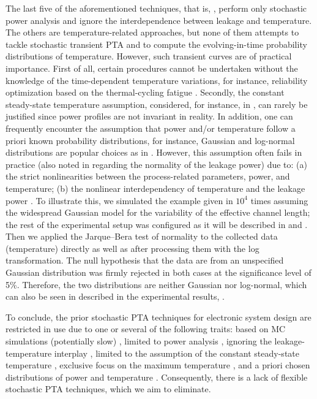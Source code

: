 The last five of the aforementioned techniques, that is, \cite{shen2009,
bhardwaj2006, bhardwaj2008, vrudhula2006, ghanta2006}, perform only stochastic
power analysis and ignore the interdependence between leakage and temperature.
The others are temperature-related approaches, but none of them attempts to
tackle stochastic transient PTA and to compute the evolving-in-time probability
distributions of temperature. However, such transient curves are of practical
importance. First of all, certain procedures cannot be undertaken without the
knowledge of the time-dependent temperature variations, for instance,
reliability optimization based on the thermal-cycling fatigue \cite{ukhov2012}.
Secondly, the constant steady-state temperature assumption, considered, for
instance, in \cite{juan2011, juan2012, huang2009a, lee2013}, can rarely be
justified since power profiles are not invariant in reality. In addition, one
can frequently encounter the assumption that power and/or temperature follow a
priori known probability distributions, for instance, Gaussian and log-normal
distributions are popular choices as in \cite{srivastava2010, juan2012,
bhardwaj2006}. However, this assumption often fails in practice (also noted in
\cite{juan2012} regarding the normality of the leakage power) due to: (a) the
strict nonlinearities between the process-related parameters, power, and
temperature; (b) the nonlinear interdependency of temperature and the leakage
power \cite{liu2007}. To illustrate this, we simulated the example given in
 $10^4$ times assuming the widespread Gaussian model for the
variability of the effective channel length; the rest of the experimental setup
was configured as it will be described in  and
. Then we applied the Jarque--Bera test of normality
to the collected data (temperature) directly as well as after processing them
with the log transformation. The null hypothesis that the data are from an
unspecified Gaussian distribution was firmly rejected in both cases at the
significance level of 5\%. Therefore, the two distributions are neither Gaussian
nor log-normal, which can also be seen in 
described in the experimental results, .

To conclude, the prior stochastic PTA techniques for electronic system design
are restricted in use due to one or several of the following traits: based on MC
simulations (potentially slow) \cite{chandra2010}, limited to power analysis
\cite{chandra2010, shen2009, bhardwaj2006, bhardwaj2008, vrudhula2006,
ghanta2006}, ignoring the leakage-temperature interplay \cite{huang2009a,
shen2009, bhardwaj2006, bhardwaj2008, vrudhula2006, ghanta2006}, limited to the
assumption of the constant steady-state temperature \cite{juan2011, juan2012,
huang2009a, lee2013}, exclusive focus on the maximum temperature
\cite{juan2011}, and a priori chosen distributions of power and temperature
\cite{srivastava2010, juan2012, bhardwaj2006}. Consequently, there is a lack of
flexible stochastic PTA techniques, which we aim to eliminate.

